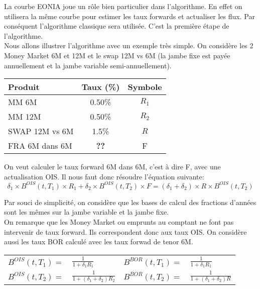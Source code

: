 \documentclass{article}
\begin{document}
La courbe EONIA joue un rôle bien particulier dans l'algorithme. En effet on utilisera la même courbe pour estimer les taux forwards et actualiser les flux. Par conséquent l'algorithme classique sera utilisée. C'est la première étape de l'algorithme.\\

Nous allons illustrer l'algorithme avec un exemple très simple. On considère les 2 Money Market 6M et 12M et le swap 12M vs 6M (la jambe fixe est payée annuellement et la jambe variable semi-annuellement).\\

\begin{center}
\begin{tabular}{|l|c|c|}
\hline
Produit & Taux (\%) & Symbole\\
\hline
MM 6M & 0.50\% & $R_1$ \\
MM 12M & 0.50\% & $R_2$ \\
SWAP 12M vs 6M & 1.5\% & $R$ \\
FRA 6M dans 6M & \textbf{??} & F \\
\hline
\end{tabular}
\end{center}

On veut calculer le taux forward 6M dans 6M, c'est à dire F, avec une actualisation OIS. Il nous faut donc résoudre l'équation suivante:\\
\[
\delta_1 \times B^{OIS}(t,T_1) \times R_1 + \delta_2 \times B^{OIS}(t,T_2) \times F = (\delta_1 + \delta_2) \times R \times B^{OIS}(t,T_2)
\]

Par souci de simplicité, on considère que les bases de calcul des fractions d'années sont les mêmes sur la jambe variable et la jambe fixe.\\

On remarque que les Money Market ou emprunts au comptant ne font pas intervenir de taux forward. Ils correspondent donc aux taux OIS. On considère aussi les taux BOR calculé avec les taux forwad de tenor 6M.

\begin{center}
\begin{tabular}{r l r l}
$B^{OIS}(t,T_1)=$ & $\frac{1}{1+\delta_1 R_1}$ & $B^{BOR}(t,T_1)=$ & $\frac{1}{1+\delta_1 R_1}$ \\
$B^{OIS}(t,T_2)=$ & $\frac{1}{1+(\delta_1 + \delta_2) R_2}$ & $B^{BOR}(t,T_2)=$ & $\frac{1}{1+(\delta_1 + \delta_2) R}$ \\
\end{tabular}
\end{center}
\end{document}
